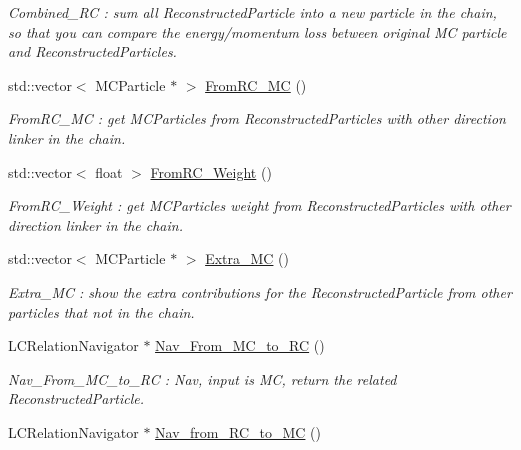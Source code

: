 \begin{DoxyCompactItemize}
\begin{DoxyCompactList}\small\item\em Combined\_\-RC : sum all ReconstructedParticle into a new particle in the chain, so that you can compare the energy/momentum loss between original MC particle and ReconstructedParticles. \item\end{DoxyCompactList}\item 
std::vector$<$ MCParticle $\ast$ $>$ \hyperlink{classToolSet_1_1CChain__Single_a377dc8f0e7ec185636c3e7c6f3c23164}{FromRC\_\-MC} ()
\begin{DoxyCompactList}\small\item\em FromRC\_\-MC : get MCParticles from ReconstructedParticles with other direction linker in the chain. \item\end{DoxyCompactList}\item 
std::vector$<$ float $>$ \hyperlink{classToolSet_1_1CChain__Single_ae52db47ff11ecb7553f38adeaf44ca79}{FromRC\_\-Weight} ()
\begin{DoxyCompactList}\small\item\em FromRC\_\-Weight : get MCParticles weight from ReconstructedParticles with other direction linker in the chain. \item\end{DoxyCompactList}\item 
std::vector$<$ MCParticle $\ast$ $>$ \hyperlink{classToolSet_1_1CChain__Single_a35481afff23b06832e9987e8caaf7e14}{Extra\_\-MC} ()
\begin{DoxyCompactList}\small\item\em Extra\_\-MC : show the extra contributions for the ReconstructedParticle from other particles that not in the chain. \item\end{DoxyCompactList}\item 
LCRelationNavigator $\ast$ \hyperlink{classToolSet_1_1CChain__Single_a366ba84d1f485f8b5aa62b6540568774}{Nav\_\-From\_\-MC\_\-to\_\-RC} ()
\begin{DoxyCompactList}\small\item\em Nav\_\-From\_\-MC\_\-to\_\-RC : Nav, input is MC, return the related ReconstructedParticle. \item\end{DoxyCompactList}\item 
LCRelationNavigator $\ast$ \hyperlink{classToolSet_1_1CChain__Single_a32a9327c08d4aa218d2510b1288045de}{Nav\_\-from\_\-RC\_\-to\_\-MC} ()

\end{DoxyCompactItemize}

